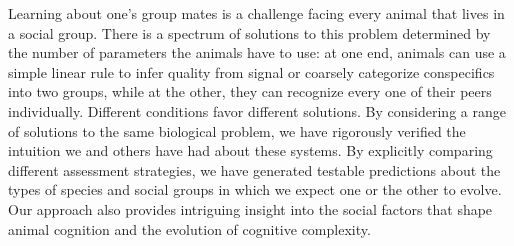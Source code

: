 Learning about one's group mates is a challenge facing every animal that lives in a social group. There is a spectrum of solutions to this problem determined by the number of parameters the animals have to use: at one end, animals can use a simple linear rule to infer quality from signal or coarsely categorize conspecifics into two groups, while at the other, they can recognize every one of their peers individually.
Different conditions favor different solutions. By considering a range of solutions to the same biological problem, we have rigorously verified the intuition we and others have had about these systems. By explicitly comparing different assessment strategies, we have generated testable predictions about the types of species and social groups in which we expect one or the other to evolve. Our approach also provides intriguing insight into the social factors that shape animal cognition and the evolution of cognitive complexity. 
\newpage



\newpage


